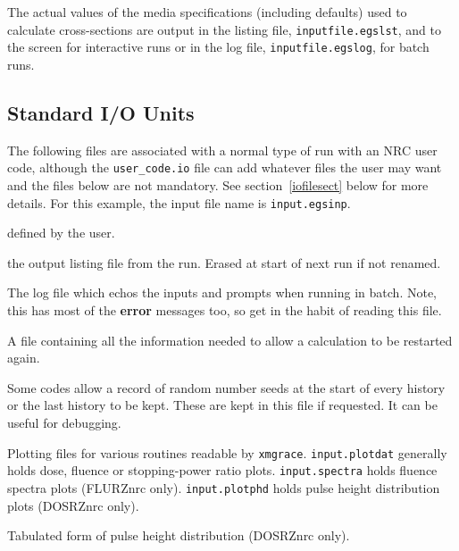 \documentclass[12pt,twoside]{article}  %
\begin{document}
The actual values of the media specifications (including defaults) used to calculate cross-sections are
output in the listing file, {\tt inputfile.egslst}, and to the screen for interactive runs or in the
log file, {\tt inputfile.egslog}, for batch runs.

\subsection{Standard I/O Units}
\label{iounits}
The following files are associated with a normal type of run with an NRC
user code, although the {\tt user\_code.io} file can add whatever files
the user
may want and the files below are not mandatory.  See section~\ref{iofilesect}
below for more details.  For
this example, the input file name is \verb+input.egsinp+.
\begin{description}

\item [input.egsinp:] defined by the user.

\item [input.egslst:]  the output listing file from the run. Erased
at start of next run if not renamed.

\item [input.egslog:] The log file which echos the inputs and
prompts when running in batch. Note, this has most of the {\bf error}
messages too, so get in the habit of reading this file.

\item [input.egsdat:] A file containing all the information needed to
allow a calculation to be restarted again.

\item [input.egsrns:] Some codes allow a record of random number seeds
at the start of every history or the last history to be kept. These are
kept in this file if requested. It can be useful for debugging.

\item [input.plotdat, input.spectra, input.plotphd:] Plotting files for
various routines readable by \verb+xmgrace+.  {\tt input.plotdat} generally
holds dose, fluence or stopping-power ratio plots. {\tt input.spectra}
holds fluence spectra plots (FLURZnrc only).  {\tt input.plotphd} holds
pulse height distribution plots (DOSRZnrc only).

\item [input.egseff:] Tabulated form of pulse height distribution
(DOSRZnrc only).


\end{description}
\end{document}
